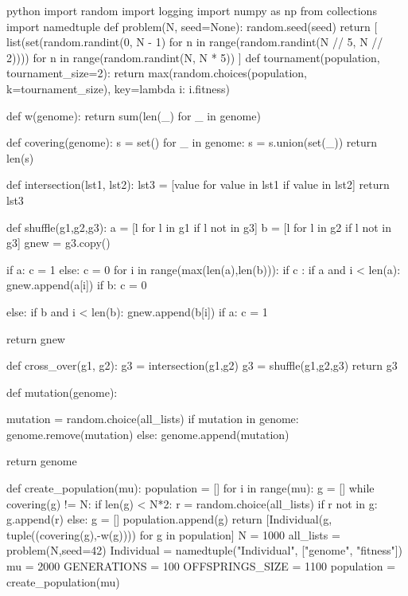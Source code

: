 \begin{mintedbox}{python}
  import random
  import logging
  import numpy as np
  from collections import namedtuple
  def problem(N, seed=None):
      random.seed(seed)
      return [
          list(set(random.randint(0, N - 1) for n in range(random.randint(N // 5, N // 2))))
          for n in range(random.randint(N, N * 5))
      ]
  def tournament(population, tournament_size=2):
      return max(random.choices(population, k=tournament_size), key=lambda i: i.fitness)

  def w(genome):
      return sum(len(_) for _ in genome)

  def covering(genome):
      s = set()
      for _ in genome:
         s =  s.union(set(_))
      return len(s)

  def intersection(lst1, lst2):
      lst3 = [value for value in lst1 if value in lst2]
      return lst3

  def shuffle(g1,g2,g3):
      a = [l for l in g1 if l not in g3]
      b = [l for l in g2 if l not in g3]
      gnew = g3.copy()

      if a:
          c = 1
      else:
          c = 0
      for i in range(max(len(a),len(b))):
          if c :
              if a and i < len(a):
                  gnew.append(a[i])
              if b:
                  c = 0

          else:
              if b and i < len(b):
                  gnew.append(b[i])
              if a:
                  c = 1

      return gnew

  def cross_over(g1, g2):
      g3 = intersection(g1,g2)
      g3 = shuffle(g1,g2,g3)
      return g3


  def mutation(genome):

      mutation = random.choice(all_lists)
      if mutation in genome:
          genome.remove(mutation)
      else:
          genome.append(mutation)

      return genome

  def create_population(mu):
      population = []
      for i in range(mu):
          g = []
          while covering(g) != N:
              if len(g) < N*2:
                  r = random.choice(all_lists)
                  if r not in g:
                      g.append(r)
              else:
                  g = []
          population.append(g)
      return [Individual(g, tuple((covering(g),-w(g)))) for g in population]
  N = 1000
  all_lists = problem(N,seed=42)
  Individual = namedtuple("Individual", ["genome", "fitness"])
  mu = 2000
  GENERATIONS = 100
  OFFSPRINGS_SIZE = 1100
  population = create_population(mu)


\end{mintedbox}

